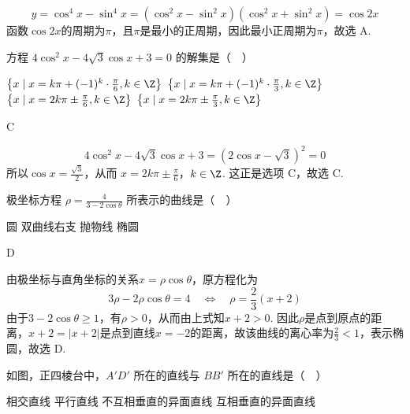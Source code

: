 \documentclass[UTF8,a4paper,oneside,11pt]{ctexbook}
\begin{document}
\begin{solution}
\[
y=\cos^4x-\sin^4x
=(\cos^2x-\sin^2x)(\cos^2x+\sin^2x)
=\cos 2x
\]
函数\(\cos 2x\)的周期为\(\pi\)，且\(\pi\)是最小的正周期，因此最小正周期为\(\pi\)，故选 A.
\end{solution}

\begin{problem}

方程 \(4\cos^2 x - 4\sqrt{3}\cos x + 3 = 0\) 的解集是（\(\quad\)）

\choices
    {\(\left\{x\mid x = k\pi +(-1)^k\cdot \frac{\pi}{6},k\in \Z\right\}\)}
    {\(\left\{x\mid x = k\pi +(-1)^k\cdot \frac{\pi}{3},k\in \Z\right\}\)}
    {\(\left\{x\mid x = 2k\pi \pm \frac{\pi}{6},k\in \Z\right\}\)}
    {\(\left\{x\mid x = 2k\pi \pm \frac{\pi}{3},k\in \Z\right\}\)}
\end{problem}

\begin{answer}
C
\end{answer}

\begin{solution}
\[
4\cos^2x-4\sqrt{3}\cos x+3
=(2\cos x-\sqrt{3})^2=0
\]
所以\(\cos x=\frac{\sqrt{3}}{2}\)，从而
\(x=2k\pi\pm\frac{\pi}{6}\)，\(k\in\Z\).
这正是选项 C，故选 C.
\end{solution}

\begin{problem}

极坐标方程 \(\rho = \frac{4}{3 - 2\cos\theta}\) 所表示的曲线是（\(\quad\)）

\choices
    {圆}
    {双曲线右支}
    {抛物线}
    {椭圆}
\end{problem}

\begin{answer}
D
\end{answer}

\begin{solution}
由极坐标与直角坐标的关系\(x=\rho\cos\theta\)，原方程化为
\[
3\rho-2\rho\cos\theta=4
\quad\Longleftrightarrow\quad
\rho=\frac{2}{3}(x+2)
\]
由于\(3-2\cos\theta\ge1\)，有\(\rho>0\)，从而由上式知\(x+2>0\). 因此\(\rho\)是点到原点的距离，\(x+2=\lvert x+2\rvert\)是点到直线\(x=-2\)的距离，故该曲线的离心率为\(\frac{2}{3}<1\)，表示椭圆，故选 D.
\end{solution}

\begin{problem}

如图，正四棱台中，\(A'D'\) 所在的直线与 \(BB'\) 所在的直线是（\(\quad\)）


\choices
    {相交直线}
    {平行直线}
    {不互相垂直的异面直线}
    {互相垂直的异面直线}
\end{problem}
\end{document}
